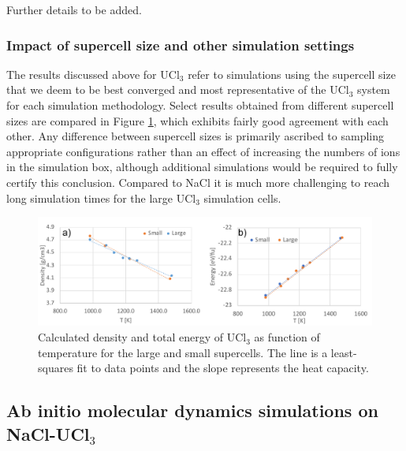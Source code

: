 \documentclass[preprint,3p,10pt,twocolumn,number,sort&compress]{elsarticle}
\begin{document}

{\color{red} Further details to be added.}

\subsubsection{Impact of supercell size and other simulation settings}
The results discussed above for UCl$_3$ refer to simulations using the supercell size that we deem to be best converged and most representative of the UCl$_3$ system for each simulation methodology. Select results obtained from different supercell sizes are compared in Figure \ref{fig:UCl3size}, which exhibits fairly good agreement with each other. Any difference between supercell sizes is primarily ascribed to sampling appropriate configurations rather than an effect of increasing the numbers of ions in the simulation box, although additional simulations would be required to fully certify this conclusion. Compared to NaCl it is much more challenging to reach long simulation times for the large UCl$_3$ simulation cells. 

\begin{figure}[htb]
\centering
\includegraphics[width=1.00\textwidth]{FIG4b.pdf}
\caption{Calculated density and total energy of UCl$_3$ as function of temperature for the large and small supercells. The line is a least-squares fit to data points and the slope represents the heat capacity.} 
\label{fig:UCl3size}
\end{figure}

\subsection{Ab initio molecular dynamics simulations on NaCl-UCl$_3$}
\end{document}
